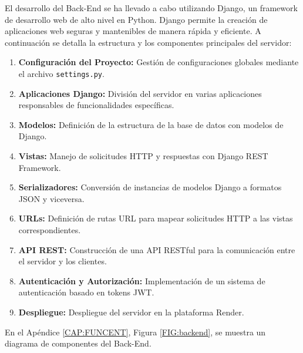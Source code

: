 El desarrollo del Back-End se ha llevado a cabo utilizando Django, un framework de desarrollo web de alto nivel en Python. Django permite la creación de aplicaciones web seguras y mantenibles de manera rápida y eficiente. A continuación se detalla la estructura y los componentes principales del servidor:
\begin{enumerate}
    \item \textbf{Configuración del Proyecto:} Gestión de configuraciones globales mediante el archivo \texttt{settings.py}.
    \item \textbf{Aplicaciones Django:} División del servidor en varias aplicaciones responsables de funcionalidades específicas.
    \item \textbf{Modelos:} Definición de la estructura de la base de datos con modelos de Django.
    \item \textbf{Vistas:} Manejo de solicitudes HTTP y respuestas con Django REST Framework.
    \item \textbf{Serializadores:} Conversión de instancias de modelos Django a formatos JSON y viceversa.
    \item \textbf{URLs:} Definición de rutas URL para mapear solicitudes HTTP a las vistas correspondientes.
    \item \textbf{API REST:} Construcción de una API RESTful para la comunicación entre el servidor y los clientes.
    \item \textbf{Autenticación y Autorización:} Implementación de un sistema de autenticación basado en tokens JWT.
    \item \textbf{Despliegue:} Despliegue del servidor en la plataforma Render.
\end{enumerate}

En el Apéndice \ref{CAP:FUNCENT}, Figura \ref{FIG:backend}, se muestra un diagrama de componentes del Back-End.